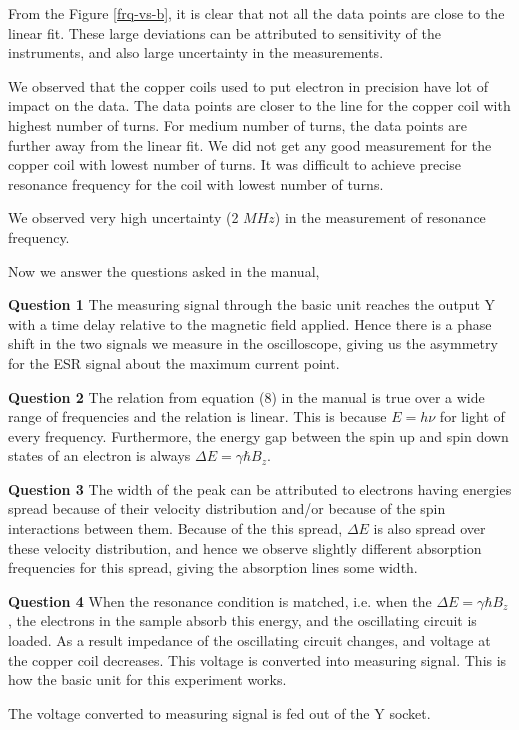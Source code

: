 \documentclass[letterpaper,12pt]{article}
\begin{document}
From the Figure \ref{frq-vs-b}, it is clear that not all the data points are close to the linear fit. These large 
deviations can be attributed to sensitivity of the instruments, and also large uncertainty in the measurements.

We observed that the copper coils used to put electron in precision have lot of impact on the data. The data points 
are closer to the line for the copper coil with highest number of turns. For medium number of turns, the 
data points are further away from the linear fit. We did not get any good measurement for the copper coil with lowest
number of turns. It was difficult to achieve precise resonance frequency for the coil with lowest number of turns.

We observed very high uncertainty (2 $MHz$) in the measurement of resonance frequency.

Now we answer the questions asked in the manual,

\textbf{Question 1}
The measuring signal through the basic unit reaches the output Y with a time delay relative to 
the magnetic field applied. Hence there is a phase shift in the two signals we measure in the 
oscilloscope, giving us the asymmetry for the ESR signal about the maximum current point. 

\textbf{Question 2}
The relation from equation (8) in the manual is true over a wide range of frequencies and the relation is linear. 
This is because $E=h\nu$ for light of every frequency. Furthermore, the energy gap between the spin up and spin down states of an electron is always $\Delta E = \gamma  \hbar  B_z$.

\textbf{Question 3}
The width of the peak can be attributed to electrons having energies spread because of their velocity distribution and/or because of the spin interactions between them. 
Because of the this spread, $\Delta E$ is also spread over these velocity distribution, and hence  we observe slightly different
absorption frequencies for this spread, giving the absorption lines some width. 

\textbf{Question 4}
When the resonance condition is matched, i.e. when the $\Delta E = \gamma \hbar B_z$, the electrons 
in the sample absorb this energy, and  the oscillating circuit is loaded. As a result impedance of the
oscillating circuit changes, and voltage at the copper coil decreases. This voltage is converted into 
measuring signal. This is how the basic unit for this experiment works. 

The voltage converted to measuring signal is fed out of the Y socket. 
\end{document}
